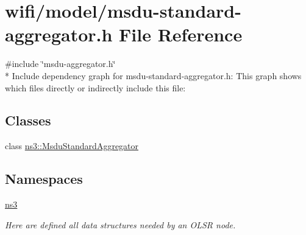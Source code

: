 \hypertarget{msdu-standard-aggregator_8h}{}\section{wifi/model/msdu-\/standard-\/aggregator.h File Reference}
\label{msdu-standard-aggregator_8h}
{\ttfamily \#include \char`\"{}msdu-\/aggregator.\+h\char`\"{}}\\*
Include dependency graph for msdu-\/standard-\/aggregator.h\+:
This graph shows which files directly or indirectly include this file\+:
\subsection*{Classes}
\begin{DoxyCompactItemize}
\item 
class \hyperlink{classns3_1_1MsduStandardAggregator}{ns3\+::\+Msdu\+Standard\+Aggregator}
\end{DoxyCompactItemize}
\subsection*{Namespaces}
\begin{DoxyCompactItemize}
\item 
 \hyperlink{namespacens3}{ns3}
\begin{DoxyCompactList}\small\item\em Here are defined all data structures needed by an O\+L\+SR node. \end{DoxyCompactList}\end{DoxyCompactItemize}
